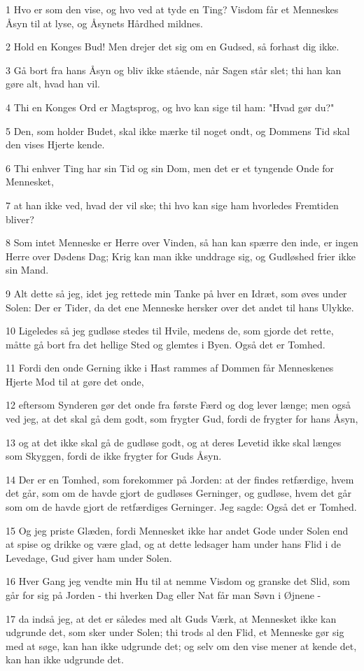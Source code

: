 \par 1 Hvo er som den vise, og hvo ved at tyde en Ting? Visdom får et Menneskes Åsyn til at lyse, og Åsynets Hårdhed mildnes.
\par 2 Hold en Konges Bud! Men drejer det sig om en Gudsed, så forhast dig ikke.
\par 3 Gå bort fra hans Åsyn og bliv ikke stående, når Sagen står slet; thi han kan gøre alt, hvad han vil.
\par 4 Thi en Konges Ord er Magtsprog, og hvo kan sige til ham: "Hvad gør du?"
\par 5 Den, som holder Budet, skal ikke mærke til noget ondt, og Dommens Tid skal den vises Hjerte kende.
\par 6 Thi enhver Ting har sin Tid og sin Dom, men det er et tyngende Onde for Mennesket,
\par 7 at han ikke ved, hvad der vil ske; thi hvo kan sige ham hvorledes Fremtiden bliver?
\par 8 Som intet Menneske er Herre over Vinden, så han kan spærre den inde, er ingen Herre over Dødens Dag; Krig kan man ikke unddrage sig, og Gudløshed frier ikke sin Mand.
\par 9 Alt dette så jeg, idet jeg rettede min Tanke på hver en Idræt, som øves under Solen: Der er Tider, da det ene Menneske hersker over det andet til hans Ulykke.
\par 10 Ligeledes så jeg gudløse stedes til Hvile, medens de, som gjorde det rette, måtte gå bort fra det hellige Sted og glemtes i Byen. Også det er Tomhed.
\par 11 Fordi den onde Gerning ikke i Hast rammes af Dommen får Menneskenes Hjerte Mod til at gøre det onde,
\par 12 eftersom Synderen gør det onde fra første Færd og dog lever længe; men også ved jeg, at det skal gå dem godt, som frygter Gud, fordi de frygter for hans Åsyn,
\par 13 og at det ikke skal gå de gudløse godt, og at deres Levetid ikke skal længes som Skyggen, fordi de ikke frygter for Guds Åsyn.
\par 14 Der er en Tomhed, som forekommer på Jorden: at der findes retfærdige, hvem det går, som om de havde gjort de gudløses Gerninger, og gudløse, hvem det går som om de havde gjort de retfærdiges Gerninger. Jeg sagde: Også det er Tomhed.
\par 15 Og jeg priste Glæden, fordi Mennesket ikke har andet Gode under Solen end at spise og drikke og være glad, og at dette ledsager ham under hans Flid i de Levedage, Gud giver ham under Solen.
\par 16 Hver Gang jeg vendte min Hu til at nemme Visdom og granske det Slid, som går for sig på Jorden - thi hverken Dag eller Nat får man Søvn i Øjnene -
\par 17 da indså jeg, at det er således med alt Guds Værk, at Mennesket ikke kan udgrunde det, som sker under Solen; thi trods al den Flid, et Menneske gør sig med at søge, kan han ikke udgrunde det; og selv om den vise mener at kende det, kan han ikke udgrunde det.

